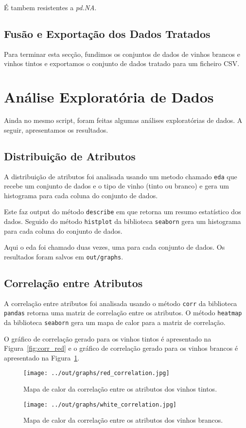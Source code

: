 \documentclass{article}
\begin{document}
É tambem resistentes a \textit{pd.NA}.

\subsection{Fusão e Exportação dos Dados Tratados}
Para terminar esta secção, fundimos os conjuntos de dados de vinhos brancos e vinhos tintos e exportamos o conjunto de dados tratado para um ficheiro CSV.

\section{Análise Exploratória de Dados}

Ainda no mesmo script, foram feitas algumas análises exploratórias de dados. A seguir, apresentamos os resultados.

\subsection{Distribuição de Atributos}
A distribuição de atributos foi analisada usando um metodo chamado \texttt{eda} que recebe um conjunto de dados e o tipo de vinho (tinto ou branco) e gera um histograma para cada coluna do conjunto de dados.

Este faz output do método \texttt{describe} em que retorna um resumo estatístico dos dados. Seguido do método \texttt{histplot} da biblioteca \texttt{seaborn} gera um histograma para cada coluna do conjunto de dados.

Aqui o eda foi chamado duas vezes, uma para cada conjunto de dados. Os resultados foram salvos em \texttt{out/graphs}.

\subsection{Correlação entre Atributos}
A correlação entre atributos foi analisada usando o método \texttt{corr} da biblioteca \texttt{pandas} retorna uma matriz de correlação entre os atributos. O método \texttt{heatmap} da biblioteca \texttt{seaborn} gera um mapa de calor para a matriz de correlação.

O gráfico de correlação gerado para os vinhos tintos é apresentado na Figura~\ref{fig:corr_red} e o gráfico de correlação gerado para os vinhos brancos é apresentado na Figura~\ref{fig:corr_white}.

\begin{figure}
  \centering
  \begin{minipage}{0.45\textwidth}
    \centering
    \texttt{[image: ../out/graphs/red\_correlation.jpg]}
    \caption{Mapa de calor da correlação entre os atributos dos vinhos tintos.}
    \label{fig:corr_red}
  \end{minipage}
  \hfill
  \begin{minipage}{0.45\textwidth}
    \centering
    \texttt{[image: ../out/graphs/white\_correlation.jpg]}
    \caption{Mapa de calor da correlação entre os atributos dos vinhos brancos.}
    \label{fig:corr_white}
  \end{minipage}
\end{figure}
\end{document}
